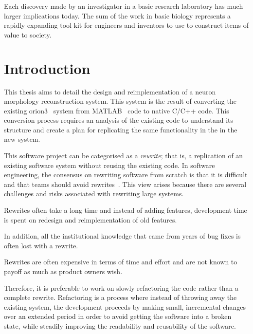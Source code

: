 \begin{savequote}[0.55\linewidth]
	\begin{fancyquote}
		Each discovery made by an investigator in a basic research
		laboratory has much larger implications today. The sum of the work in basic
		biology represents a rapidly expanding tool kit for engineers and inventors to
		use to construct items of value to society.
	\end{fancyquote}
\end{savequote}
\chapter{Introduction}\label{ch:introduction}


This thesis aims to detail the design and reimplementation of a
neuron morphology reconstruction system. This system is the result of
converting the existing \gls{orion3}~\autocite{ORION_Santamaria-Pang2015} system from
MATLAB~\autocite{MATLAB:2013a} code to native C/C++ code.
This conversion process requires an analysis of the existing code
to understand its structure and create a plan for replicating the
same functionality in the in the new system.

This software project can be categorised as a \emph{rewrite}; that
is, a replication of an existing software system without
reusing the existing code. In software engineering, the consensus
on rewriting software from scratch is that it is difficult and
that teams should avoid rewrites~\autocite{Software-rewrites:Spolsky:2000}. This view
arises because there are several challenges and risks associated
with rewriting large systems.
\begin{itemize*}[label={}]
\item Rewrites often take a long time and instead of adding
	features, development time is spent on redesign and
	reimplementation of old features.
\item In addition, all the institutional knowledge that came from
	years of bug fixes is often lost with a rewrite.
\item Rewrites are often expensive in terms of time and effort and
	are not known to payoff as much as product owners wish.
\end{itemize*}
Therefore, it is preferable to work on slowly refactoring the code
rather than a complete rewrite. Refactoring is a process where
instead of throwing away the existing system, the development
proceeds by making small, incremental changes over an extended
period in order to avoid getting the software into a broken state,
while steadily improving the readability and reusability of the
software.

